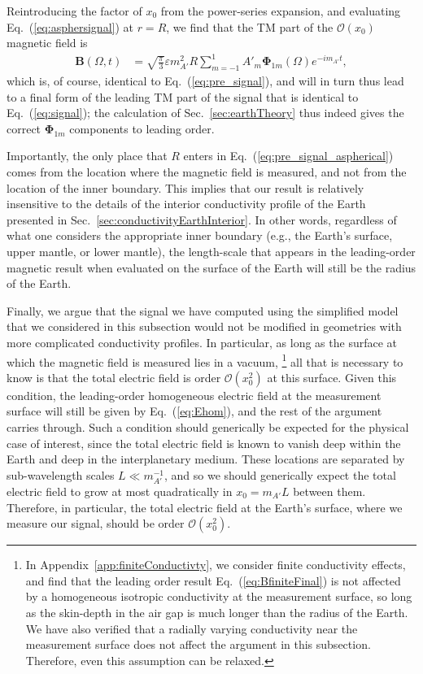\documentclass[amsmath,amssymb,aps,10pt,prd,letterpaper,nofootinbib,balancelastpage,notitlepage,superscriptaddress,twocolumn,floatfix]{revtex4-2}
\newcommand{\secref}[2][]{Sec{#1}.~\ref{#2}}		%
\newcommand{\appref}[2][x]{Appendi{#1}~\ref{#2}}	%
\renewcommand{\eqref}[2][]{Eq{#1}.~(\ref{eq:#2})}	%
\begin{document}
Reintroducing the factor of $x_0$ from the power-series expansion, and evaluating \eqref{asphersignal} at $r=R$, we find that the TM part of the $\mathcal{O}(x_0)$ magnetic field is
\begin{align}
    \bm{B}(\Omega,t)&=\sqrt{\frac\pi3}\varepsilon m_{A'}^2R\sum_{m=-1}^1A'_m\bm{\Phi}_{1m}(\Omega)e^{-im_{A'}t},
    \label{eq:pre_signal_aspherical}
\end{align}
which is, of course, identical to \eqref{pre_signal}, and will in turn thus lead to a final form of the leading TM part of the signal that is identical to \eqref{signal}; the calculation of \secref{sec:earthTheory} thus indeed gives the correct $\bm\Phi_{1m}$ components to leading order.

Importantly, the only place that $R$ enters in \eqref{pre_signal_aspherical} comes from the location where the magnetic field is measured, and not from the location of the inner boundary.
This implies that our result is relatively insensitive to the details of the interior conductivity profile of the Earth presented in \secref{sec:conductivityEarthInterior}.
In other words, regardless of what one considers the appropriate inner boundary (e.g., the Earth's surface, upper mantle, or lower mantle), the length-scale that appears in the leading-order magnetic result when evaluated on the surface of the Earth will still be the radius of the Earth.

Finally, we argue that the signal we have computed using the simplified model that we considered in this subsection would not be modified in geometries with more complicated conductivity profiles.
In particular, as long as the surface at which the magnetic field is measured lies in a vacuum,%
\footnote{\label{ftnt:finiteconductivity}%
    In \appref{app:finiteConductivty}, we consider finite conductivity effects, and find that the leading order result \eqref{BfiniteFinal} is not affected by a homogeneous isotropic conductivity at the measurement surface, so long as the skin-depth in the air gap is much longer than the radius of the Earth.
    We have also verified that a radially varying conductivity near the measurement surface does not affect the argument in this subsection.
    Therefore, even this assumption can be relaxed.
} %
all that is necessary to know is that the total electric field is order $\mathcal O(x_0^2)$ at this surface.
Given this condition, the leading-order homogeneous electric field at the measurement surface will still be given by \eqref{Ehom}, and the rest of the argument carries through. 
Such a condition should generically be expected for the physical case of interest, since the total electric field is known to vanish deep within the Earth and deep in the interplanetary medium.
These locations are separated by sub-wavelength scales $L\ll m_{A'}^{-1}$, and so we should generically expect the total electric field to grow at most quadratically in $x_0=m_{A'}L$ between them. 
Therefore, in particular, the total electric field at the Earth's surface, where we measure our signal, should be order $\mathcal O(x_0^2)$.
\end{document}
